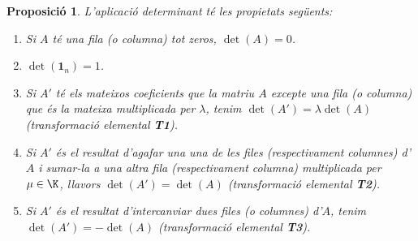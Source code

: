\documentclass[a4paper,12pt,twoside]{article}
\newcommand{\1}{\mathbf{1}}
\newcommand{\0}{\mathbf{0}}
\newtheorem{proposicio}[teorema]{Proposició}
\theoremstyle{definition}
\theoremstyle{remark}
\begin{document}
\begin{proposicio}
	L'aplicació determinant té les propietats següents:
	\begin{enumerate}[\rm (a)]
		\item Si $A$ té una fila (o columna) tot zeros, $\det(A)=0$.
		\item $\det(\1_n)=1$.
		\item Si $A'$ té els mateixos coeficients que la matriu $A$ excepte una fila (o columna) que és la mateixa multiplicada per $\lambda$, tenim $\det(A')=\lambda \det(A)$ (transformació elemental \textbf{T1}).
		\item Si $A'$ és el resultat d'agafar una una de les files (respectivament columnes) d'$A$ i sumar-la a una altra fila (respectivament columna) multiplicada per $\mu \in \K$, llavors $\det(A')=\det(A)$ (transformació elemental \textbf{T2}).
		\item Si $A'$ és el resultat d'intercanviar dues files (o columnes) d'$A$, tenim $\det(A')=-\det(A)$ (transformació elemental \textbf{T3}).
	\end{enumerate}
\end{proposicio}
\end{document}
